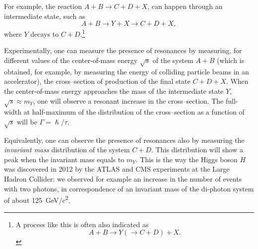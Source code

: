 For example, the reaction $A + B \to C +D+X$, can happen through an intermediate state, such as
\[ A+B \to Y+ X \to C+D+X,\]
where $Y$ decays to $C+D$.\footnote{A process like this is often also indicated as
\[
A+B\to Y(\to C+D) + X.
\]
}

Experimentally, one can measure the presence of resonances by measuring, for different values of the center-of-mass energy \(\sqrt{s}\) of the system \(A+B\) (which is obtained, for example, by measuring the energy of colliding particle beams in an accelerator), the cross--section of production of the final state \(C+D+X\). When the center-of-mass energy approaches the mass of the intermediate state \(Y\), \(\sqrt{s}\approx m_Y\), one will observe a resonant increase in the cross--section. The full-width at half-maximum of the distribution of the cross--section as a function of \(\sqrt{s}\) will be \(\Gamma=\hslash/\tau\).

Equivalently, one can observe the presence of resonances also by measuring the \emph{invariant mass} distribution of the system \(C+D\). This distribution will show a peak when the invariant mass equals to \(m_Y\). This is the way the Higgs boson \(H\) was discovered in 2012 by the ATLAS and CMS experiments at the Large Hadron Collider: we observed for example an increase in the number of events with two photons, in correspondence of an invariant mass of the di-photon system of about \SI{125}{GeV/c^2}.


